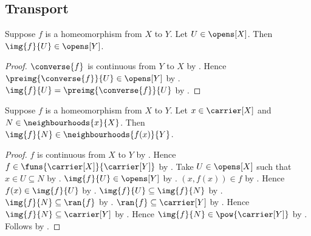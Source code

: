 \subsection{Transport}

\begin{proposition}\label{homeomorphism_image_open}
    Suppose $f$ is a homeomorphism from $X$ to $Y$.
    Let $U\in\opens[X]$.
    Then $\img{f}{U}\in\opens[Y]$.
\end{proposition}
\begin{proof}
    $\converse{f}$ is continuous from $Y$ to $X$
        by .
    Hence $\preimg{\converse{f}}{U}\in\opens[Y]$
        by .
    $\img{f}{U}=\preimg{\converse{f}}{U}$
        by .
\end{proof}

\begin{proposition}\label{homeomorphism_image_neighbourhood}
    Suppose $f$ is a homeomorphism from $X$ to $Y$.
    Let $x\in\carrier[X]$ and $N\in\neighbourhoods{x}{X}$.
    Then $\img{f}{N}\in\neighbourhoods{f(x)}{Y}$.
\end{proposition}
\begin{proof}
    $f$ is continuous from $X$ to $Y$ by .
    Hence $f\in\funs{\carrier[X]}{\carrier[Y]}$ by .
    Take $U\in\opens[X]$ such that $x\in U\subseteq N$
        by .
    $\img{f}{U}\in\opens[Y]$ by .
    $(x,f(x))\in f$ by .
    Hence $f(x)\in\img{f}{U}$ by .
    $\img{f}{U}\subseteq\img{f}{N}$ by .
    $\img{f}{N}\subseteq\ran{f}$ by .
    $\ran{f}\subseteq\carrier[Y]$ by .
    Hence $\img{f}{N}\subseteq\carrier[Y]$
        by .
    Hence $\img{f}{N}\in\pow{\carrier[Y]}$ by .
    Follows by .
\end{proof}

